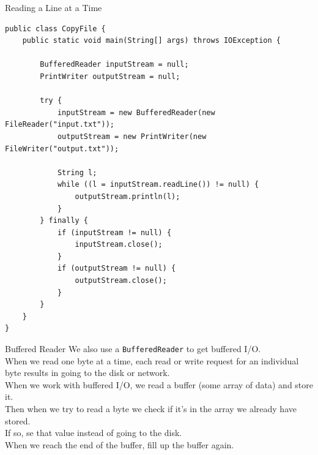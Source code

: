 \documentclass[aspectratio=169]{beamer}
\begin{document}
\begin{frame}[fragile]{Reading a Line at a Time}
\begin{Verbatim}[fontsize=\tiny]
public class CopyFile {
    public static void main(String[] args) throws IOException {

        BufferedReader inputStream = null;
        PrintWriter outputStream = null;

        try {
            inputStream = new BufferedReader(new FileReader("input.txt"));
            outputStream = new PrintWriter(new FileWriter("output.txt"));

            String l;
            while ((l = inputStream.readLine()) != null) {
                outputStream.println(l);
            }
        } finally {
            if (inputStream != null) {
                inputStream.close();
            }
            if (outputStream != null) {
                outputStream.close();
            }
        }
    }
}
\end{Verbatim}
\end{frame}



\begin{frame}{Buffered Reader}
We also use a \texttt{BufferedReader} to get buffered I/O. \\
When we read one byte at a time, each read or write request for an individual byte results in going to the disk or network. \\
When we work with buffered I/O, we read a buffer (some array of data) and store it. \\
Then when we try to read a byte we check if it's in the array we already have stored. \\
If so, se that value instead of going to the disk. \\
When we reach the end of the buffer, fill up the buffer again.
\end{frame}
\end{document}
